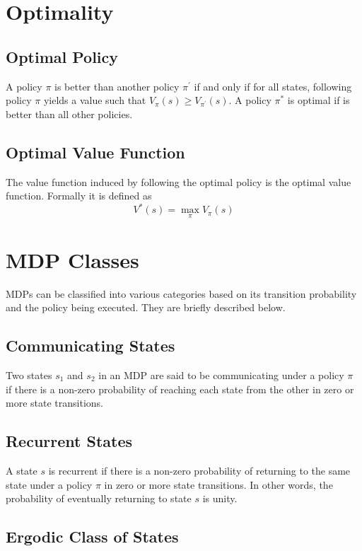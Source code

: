 \section{Optimality}

\subsection{Optimal Policy}

A policy $\pi$ is better than another policy $\pi^\prime$ if and only if for all states, following policy $\pi$ yields a value such that $V_\pi(s) \ge V_{\pi^\prime} (s)$.
A policy $\pi^*$ is optimal if is better than all other policies.

\subsection{Optimal Value Function}

The value function induced by following the optimal policy is the optimal value function. Formally it is defined as
$$V^*(s) = \max_\pi V_\pi(s)$$

\section{MDP Classes}

MDPs can be classified into various categories based on its transition probability and the policy being executed. They are briefly described below.

\subsection{Communicating States}

Two states $s_1$ and $s_2$ in an MDP are said to be communicating under a policy $\pi$ if there is a non-zero probability of reaching each state from the other in zero or more state transitions.

\subsection{Recurrent States}

A state $s$ is recurrent if there is a non-zero probability of returning to the same state under a policy $\pi$ in zero or more state transitions.
In other words, the probability of eventually returning to state $s$ is unity.

\subsection{Ergodic Class of States}

